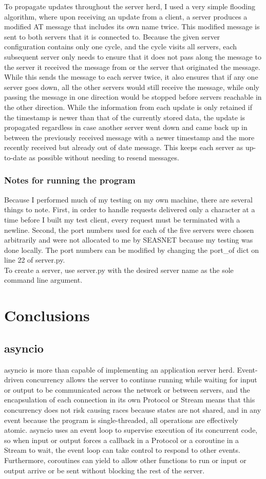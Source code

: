 \documentclass[letterpaper,twocolumn,10pt]{article}
\begin{document}
    To propagate updates throughout the server herd, I used a very simple flooding algorithm, where upon receiving an update from a client, a server produces a modified AT message that includes its own name twice. This modified message is sent to both servers that it is connected to. Because the given server configuration contains only one cycle, and the cycle visits all servers, each subsequent server only needs to ensure that it does not pass along the message to the server it received the message from or the server that originated the message. While this sends the message to each server twice, it also ensures that if any one server goes down, all the other servers would still receive the message, while only passing the message in one direction would be stopped before servers reachable in the other direction. While the information from each update is only retained if the timestamp is newer than that of the currently stored data, the update is propagated regardless in case another server went down and came back up in between the previously received message with a newer timestamp and the more recently received but already out of date message. This keeps each server as up-to-date as possible without needing to resend messages.
    \subsubsection{Notes for running the program}
    Because I performed much of my testing on my own machine, there are several things to note. First, in order to handle requests delivered only a character at a time before I built my test client, every request must be terminated with a newline. Second, the port numbers used for each of the five servers were chosen arbitrarily and were not allocated to me by SEASNET because my testing was done locally. The port numbers can be modified by changing the port\_of dict on line 22 of server.py. \\
    To create a server, use server.py with the desired server name as the sole command line argument.
    
    \section{Conclusions}
    \subsection{asyncio}
    asyncio is more than capable of implementing an application server herd. Event-driven concurrency allows the server to continue running while waiting for input or output to be communicated across the network or between servers, and the encapsulation of each connection in its own Protocol or Stream means that this concurrency does not risk causing races because states are not shared, and in any event because the program is single-threaded, all operations are effectively atomic. asyncio uses an event loop to supervise execution of its concurrent code, so when input or output forces a callback in a Protocol or a coroutine in a Stream to wait, the event loop can take control to respond to other events. Furthermore, coroutines can yield to allow other functions to run or input or output arrive or be sent without blocking the rest of the server.
\end{document}
